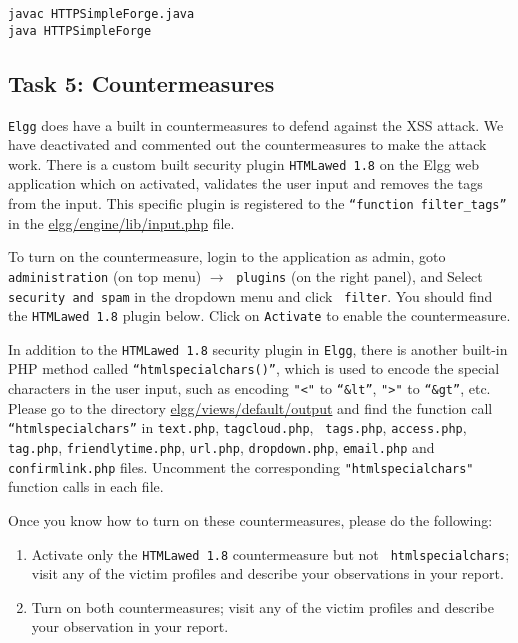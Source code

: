 \begin{Verbatim}
javac HTTPSimpleForge.java
java HTTPSimpleForge
\end{Verbatim}


\subsection{Task 5: Countermeasures}

{\tt Elgg} does have a built in countermeasures to defend against the XSS attack.
We have deactivated and commented out the countermeasures to make the
attack work.
There is a custom built security plugin {\tt HTMLawed 1.8} on the Elgg web
application which on activated, validates the user input and removes the
tags from the input. This specific plugin is registered to the
{\tt “function filter\_tags”} in the \url{elgg/engine/lib/input.php} file.


To turn on the countermeasure, login to the application as admin, goto
{\tt administration} (on top menu) $\rightarrow$ {\tt plugins} (on the right panel),
andSelect {\tt security and spam} in the dropdown menu and click {\tt
filter}. You should find the {\tt HTMLawed 1.8} plugin below. 
Click on {\tt Activate} to enable the countermeasure.


In addition to the {\tt HTMLawed 1.8} security plugin in {\tt Elgg}, there is another
built-in PHP method called {\tt “htmlspecialchars()”}, which is used to encode the special
characters in the user input, such as encoding {\tt "<"} to {\tt “\&lt”}, 
{\tt ">"} to {\tt “\&gt”}, etc. Please go to
the directory \url{elgg/views/default/output} and find the function call
{\tt “htmlspecialchars”} in {\tt text.php}, {\tt tagcloud.php}, {\tt
tags.php}, {\tt access.php}, {\tt tag.php}, {\tt friendlytime.php}, 
{\tt url.php}, {\tt dropdown.php}, {\tt email.php} and
{\tt confirmlink.php} files. Uncomment the corresponding 
{\tt "htmlspecialchars"} function calls in each file. 


Once you know how to turn on these countermeasures, please do the
following:
\begin{enumerate}

\item Activate only the {\tt HTMLawed 1.8} countermeasure but not {\tt
htmlspecialchars}; visit any of the victim profiles and describe your
observations in your report. 

\item Turn on both countermeasures; visit any of the victim profiles and 
describe your observation in your report. 



\end{enumerate}


